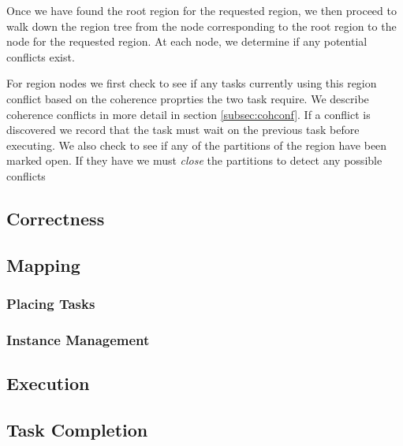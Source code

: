 Once we have found the root region for the requested region, we then proceed to walk
down the region tree from the node corresponding to the root region to the node
for the requested region.  At each node, we determine if any potential conflicts exist.

For region nodes we first check to see if any tasks currently using this region
conflict based on the coherence proprties the two task require.  We describe coherence
conflicts in more detail in section \ref{subsec:cohconf}.  If a conflict is discovered
we record that the task must wait on the previous task before executing.  We also check
to see if any of the partitions of the region have been marked open.  If they have
we must {\em close} the partitions to detect any possible conflicts

\subsection{Correctness}

\subsection{Mapping}

\subsubsection{Placing Tasks}

\subsubsection{Instance Management}

\subsection{Execution}

\subsection{Task Completion}
